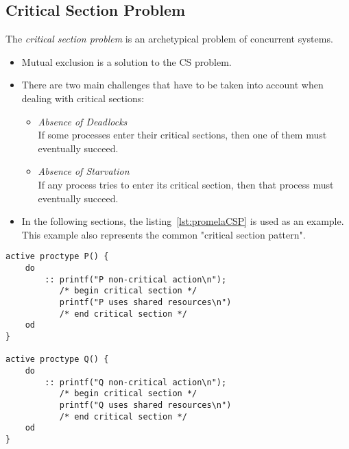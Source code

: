 		\subsection{Critical Section Problem}
			The \textit{critical section problem} is an archetypical problem of concurrent systems.
			
			
			
			
			\begin{itemize}
				\item Mutual exclusion is a solution to the CS problem.
				\item There are two main challenges that have to be taken into account when dealing with critical sections:
					\begin{itemize}
						\item \textit{Absence of Deadlocks} \\ If some processes enter their critical sections, then one of them must eventually succeed.
						\item \textit{Absence of Starvation} \\ If any process tries to enter its critical section, then that process must eventually succeed.
					\end{itemize}
				\item In the following sections, the listing~\ref{lst:promelaCSP} is used as an example. This example also represents the common "critical section pattern".
			\end{itemize}
		
			\begin{lstlisting}[caption = { Critical Section Pattern in PROMELA }, label = lst:promelaCSP, language = PROMELA]
active proctype P() {
	do
		:: printf("P non-critical action\n");
		   /* begin critical section */
		   printf("P uses shared resources\n")
		   /* end critical section */
	od
}

active proctype Q() {
	do
		:: printf("Q non-critical action\n");
		   /* begin critical section */
		   printf("Q uses shared resources\n")
		   /* end critical section */
	od
}
			\end{lstlisting}

